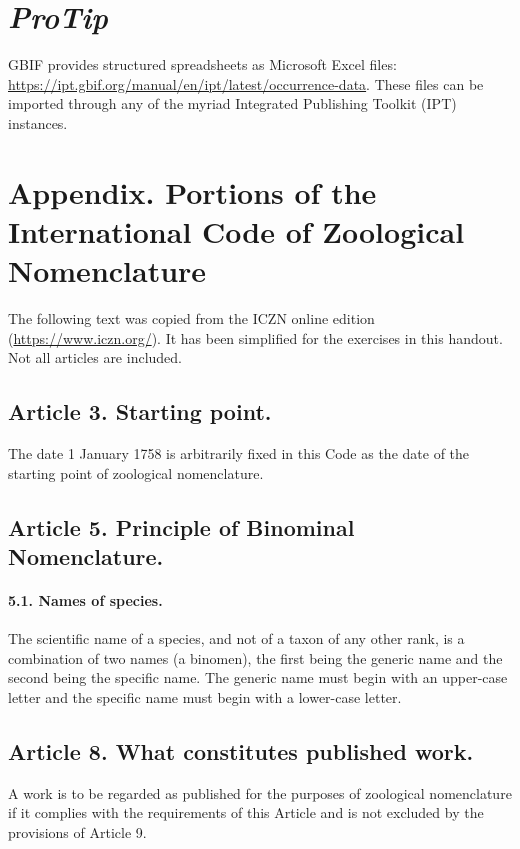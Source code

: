 \section*{\textit{ProTip}\texttrademark}
GBIF provides structured spreadsheets as Microsoft Excel files: 
\url{https://ipt.gbif.org/manual/en/ipt/latest/occurrence-data}. These files can be imported through any of the myriad Integrated Publishing Toolkit (IPT) instances.

\clearpage

\section*{Appendix. Portions of the International Code of Zoological Nomenclature}

The following text was copied from the ICZN online edition (\url{https://www.iczn.org/}). It has been simplified for the exercises in this handout. Not all articles are included.

\subsection*{Article 3. Starting point.} 

The date 1 January 1758 is arbitrarily fixed in this Code as the date of the starting point of zoological nomenclature.

\subsection*{Article 5. Principle of Binominal Nomenclature.}

\paragraph*{5.1. Names of species.} The scientific name of a species, and not of a taxon of any other rank, is a combination of two names (a binomen), the first being the generic name and the second being the specific name. The generic name must begin with an upper-case letter and the specific name must begin with a lower-case letter.

\subsection*{Article 8. What constitutes published work.}
A work is to be regarded as published for the purposes of zoological nomenclature if it complies with the requirements of this Article and is not excluded by the provisions of Article 9.

